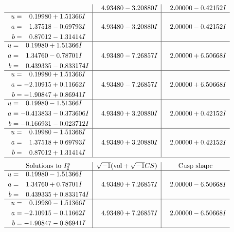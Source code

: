 \documentclass[1p]{elsarticle_modified}
\theoremstyle{definition}
\newcommand{\I}{\sqrt{-1}}
\begin{document}
$$\begin{array}{c|c|c}
 & \phantom{-}4.93480 - 3.20880 I & \phantom{-}2.00000 - 0.42152 I \\ \hline\begin{aligned}
u &= \phantom{-}0.19980 + 1.51366 I \\
a &= \phantom{-}1.37518 - 0.69793 I \\
b &= \phantom{-}0.87012 - 1.31414 I\end{aligned}
 & \phantom{-}4.93480 - 3.20880 I & \phantom{-}2.00000 - 0.42152 I \\ \hline\begin{aligned}
u &= \phantom{-}0.19980 + 1.51366 I \\
a &= \phantom{-}1.34760 - 0.78701 I \\
b &= \phantom{-}0.439335 - 0.833174 I\end{aligned}
 & \phantom{-}4.93480 - 7.26857 I & \phantom{-}2.00000 + 6.50668 I \\ \hline\begin{aligned}
u &= \phantom{-}0.19980 + 1.51366 I \\
a &= -2.10915 + 0.11662 I \\
b &= -1.90847 + 0.86941 I\end{aligned}
 & \phantom{-}4.93480 - 7.26857 I & \phantom{-}2.00000 + 6.50668 I \\ \hline\begin{aligned}
u &= \phantom{-}0.19980 - 1.51366 I \\
a &= -0.413833 - 0.373606 I \\
b &= -0.166931 - 0.023712 I\end{aligned}
 & \phantom{-}4.93480 + 3.20880 I & \phantom{-}2.00000 + 0.42152 I \\ \hline\begin{aligned}
u &= \phantom{-}0.19980 - 1.51366 I \\
a &= \phantom{-}1.37518 + 0.69793 I \\
b &= \phantom{-}0.87012 + 1.31414 I\end{aligned}
 & \phantom{-}4.93480 + 3.20880 I & \phantom{-}2.00000 + 0.42152 I\\
 \hline 
 \end{array}$$\newpage$$\begin{array}{c|c|c}  
\text{Solutions to }I^u_{2}& \I (\text{vol} + \sqrt{-1}CS) & \text{Cusp shape}\\
 \hline 
\begin{aligned}
u &= \phantom{-}0.19980 - 1.51366 I \\
a &= \phantom{-}1.34760 + 0.78701 I \\
b &= \phantom{-}0.439335 + 0.833174 I\end{aligned}
 & \phantom{-}4.93480 + 7.26857 I & \phantom{-}2.00000 - 6.50668 I \\ \hline\begin{aligned}
u &= \phantom{-}0.19980 - 1.51366 I \\
a &= -2.10915 - 0.11662 I \\
b &= -1.90847 - 0.86941 I\end{aligned}
 & \phantom{-}4.93480 + 7.26857 I & \phantom{-}2.00000 - 6.50668 I\\
 \hline 
 \end{array}$$\newpage\newpage\renewcommand{\arraystretch}{1}
\end{document}

